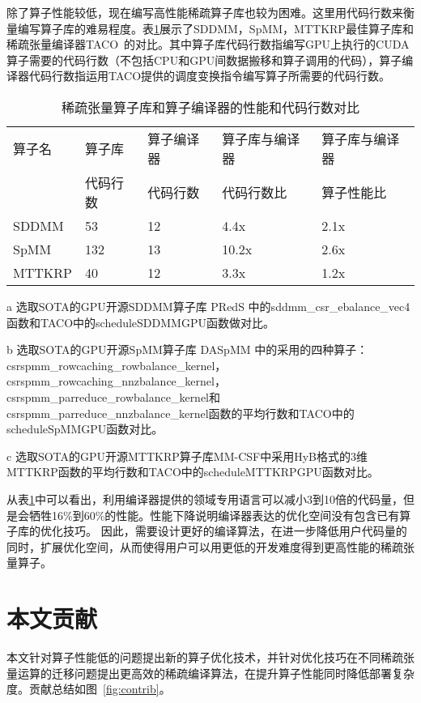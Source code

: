除了算子性能较低，现在编写高性能稀疏算子库也较为困难。这里用代码行数来衡量编写算子库的难易程度。表\ref{tab:motivation-2}展示了SDDMM，SpMM，MTTKRP最佳算子库和稀疏张量编译器TACO~\cite{kjolstad:2017:taco}的对比。其中算子库代码行数指编写GPU上执行的CUDA算子需要的代码行数（不包括CPU和GPU间数据搬移和算子调用的代码），算子编译器代码行数指运用TACO提供的调度变换指令编写算子所需要的代码行数。
\begin{table}
  \centering
  \begin{threeparttable}[c]
  \caption{稀疏张量算子库和算子编译器的性能和代码行数对比}
  \label{tab:motivation-2}
  \begin{tabular}{lllll}
    \toprule
    算子名  & 算子库 & 算子编译器 & 算子库与编译器 & 算子库与编译器   \\
           & 代码行数 & 代码行数 & 代码行数比    & 算子性能比       \\
    \midrule
    SDDMM\tnote{a}  & 53 & 12 & 4.4x & 2.1x \\
    SpMM\tnote{b}   & 132 & 13 & 10.2x & 2.6x \\
    MTTKRP\tnote{c} & 40 & 12 & 3.3x & 1.2x \\
    \bottomrule
  \end{tabular}
  \begin{tablenotes}
    \item [a] 选取SOTA的GPU开源SDDMM算子库 PRedS \cite{yu2021exploiting}中的sddmm\_csr\_ebalance\_vec4函数和TACO中的scheduleSDDMMGPU函数做对比。
    \item [b] 选取SOTA的GPU开源SpMM算子库 DASpMM \cite{dai2022heuristic}中的采用的四种算子：csrspmm\_rowcaching\_rowbalance\_kernel，
      csrspmm\_rowcaching\_nnzbalance\_kernel，csrspmm\_parreduce\_rowbalance\_kernel和csrspmm\_parreduce\_nnzbalance\_kernel函数的平均行数和TACO中的scheduleSpMMGPU函数对比。
    \item [c] 选取SOTA的GPU开源MTTKRP算子库MM-CSF\cite{nisa2019mttkrp}中采用HyB格式的3维MTTKRP函数的平均行数和TACO中的scheduleMTTKRPGPU函数对比。
  \end{tablenotes}
  \end{threeparttable}
\end{table}
从表\ref{tab:motivation-2}中可以看出，利用编译器提供的领域专用语言可以减小3到10倍的代码量，但是会牺牲16\%到60\%的性能。性能下降说明编译器表达的优化空间没有包含已有算子库的优化技巧。
因此，需要设计更好的编译算法，在进一步降低用户代码量的同时，扩展优化空间，从而使得用户可以用更低的开发难度得到更高性能的稀疏张量算子。

\section{本文贡献}
本文针对算子性能低的问题提出新的算子优化技术，并针对优化技巧在不同稀疏张量运算的迁移问题提出更高效的稀疏编译算法，在提升算子性能同时降低部署复杂度。贡献总结如图~\ref{fig:contrib}。

